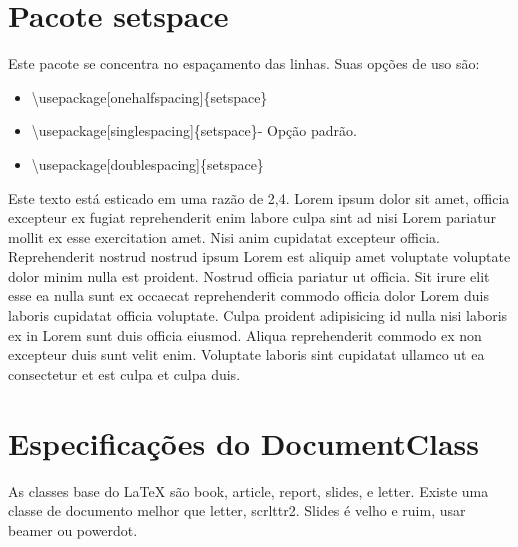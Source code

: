 \section{Pacote setspace}
Este pacote se concentra no espaçamento das linhas.
Suas opções de uso são:
\begin{itemize}
    \item \textbackslash usepackage[onehalfspacing]\{setspace\}
    \item \textbackslash usepackage[singlespacing]\{setspace\}- Opção padrão.
    \item \textbackslash usepackage[doublespacing]\{setspace\}
\end{itemize}

\begin{spacing}{2.4}
    Este texto está esticado em uma razão de 2,4. Lorem ipsum dolor sit amet,
    officia excepteur ex fugiat reprehenderit enim labore culpa sint ad nisi
    Lorem pariatur mollit ex esse exercitation amet. Nisi anim cupidatat
    excepteur officia. Reprehenderit nostrud nostrud ipsum Lorem est aliquip
    amet voluptate voluptate dolor minim nulla est proident. Nostrud officia
    pariatur ut officia. Sit irure elit esse ea nulla sunt ex occaecat
    reprehenderit commodo officia dolor Lorem duis laboris cupidatat officia
    voluptate. Culpa proident adipisicing id nulla nisi laboris ex in Lorem
    sunt duis officia eiusmod. Aliqua reprehenderit commodo ex non excepteur
    duis sunt velit enim. Voluptate laboris sint cupidatat ullamco ut ea
    consectetur et est culpa et culpa duis.
\end{spacing}

\section{Especificações do DocumentClass}
As classes base do LaTeX são book, article, report, slides, e letter.
Existe uma classe de documento melhor que letter, scrlttr2.
Slides é velho e ruim, usar beamer ou powerdot.

